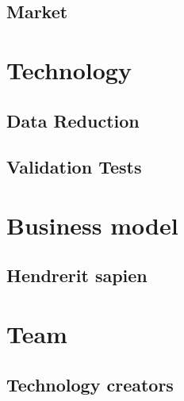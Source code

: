 \chapter{Market} \label{ch:hendrerit}

\newpage
%
%

\part{Technology}
\newpage
\chapter{Data Reduction} \label{ch:hendrerit}

\chapter{Validation Tests} \label{ch:hendrerit}


\part{Business model}
\newpage
\chapter{Hendrerit sapien} \label{ch:hendrerit}

\newpage



\part{Team}
\newpage
\chapter{Technology creators} \label{ch:hendrerit}

\newpage
%

